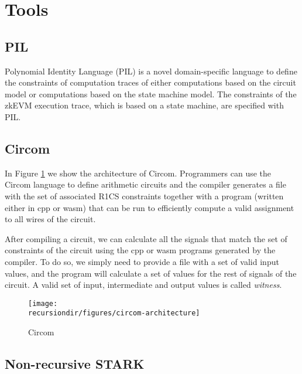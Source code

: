 

\section{Tools}

\subsection{PIL}

Polynomial Identity Language (PIL) is a novel domain-specific language to define the constraints of computation traces of either computations based on the circuit model or computations based on the state machine model. 
The constraints of the zkEVM execution trace, which is based on a state machine, are specified with PIL.


\subsection{Circom}

In Figure \ref{fig:circom_architecture} we show the architecture of Circom.
Programmers can use the Circom language to define arithmetic circuits and the compiler generates a file with the set of associated R1CS constraints together with a program (written either in cpp or wasm) that can be run to efficiently compute a valid assignment to all wires of the circuit.

After compiling a circuit, we can calculate all the signals that match the set of constraints of the circuit using the cpp or wasm programs generated by the compiler. To do so, we simply need to provide a file with a set of valid input values, and the program will calculate a set of values for the rest of signals of the circuit. A valid set of input, intermediate and output values is called \textit{witness}.

\begin{figure}[H]
\centering
\texttt{[image: \\recursiondir/figures/circom-architecture]}
\caption{Circom}
\label{fig:circom_architecture}
\end{figure}



\subsection{Non-recursive STARK \label{subsec:non_recursive_STARK}}

